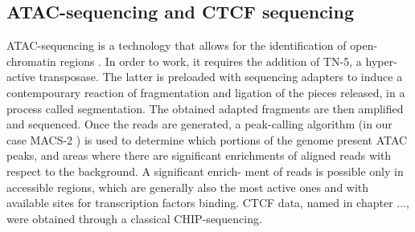 \subsection{ATAC-sequencing and CTCF sequencing}
ATAC-sequencing is a technology that allows for the identification of open-
chromatin regions 
\cite{buenrostroTranspositionNativeChromatin2013a, grandiChromatinAccessibilityProfiling2022}. In order to work, it requires the addition of TN-5,
a hyper-active transposase. The latter is preloaded with sequencing adapters
\cite{grandiChromatinAccessibilityProfiling2022}
to induce a contempourary reaction of fragmentation and ligation of the pieces released, in
a process called segmentation. The obtained adapted fragments are then amplified and sequenced. Once the reads are generated, a peak-calling algorithm (in our case MACS-2 
\cite{zhangModelbasedAnalysisChIPSeq2008a}
) is used to determine which portions of the genome present ATAC peaks, and areas where there are
significant enrichments of aligned reads with respect to the background. A significant enrich-
ment of reads is possible only in accessible regions, which are generally also the most active
ones and with available sites for transcription factors binding.
CTCF data, named in chapter ..., were obtained through a classical CHIP-sequencing.